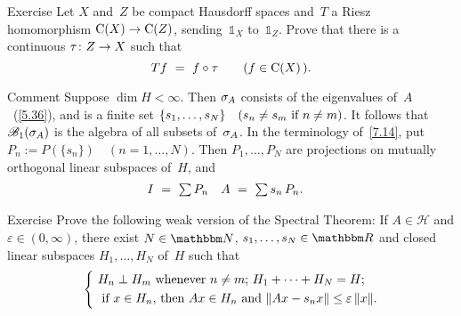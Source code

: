 \documentclass[main.tex]{subfiles}
\begin{document}
%
%
\begin{psec}{7.15}{Exercise}
Let $X$ and~$Z$ be compact Hausdorff spaces
and~$T$ a Riesz homomorphism $\mathrm{C}(X)\rightarrow\mathrm{C}(Z)$,
sending~$\mathbb{1}_X$ to~$\mathbb{1}_Z$.
Prove that there is a continuous $\tau\colon Z\rightarrow X$
such that
\begin{equation*}
Tf\ =\ f\circ\tau\qquad (f\in\Cont{X}\,)\htam{.}
\end{equation*}
\end{psec}
%
%
\begin{psec}{7.16}{Comment}
Suppose $\dim H<\infty$.
Then $\sigma_{A}$ consists of the eigenvalues of~$A$~(\ref{5.36}),
and is a finite set $\{s_1,\dotsc,s_N\}\quad(s_n\neq s_m\text{ if }n\neq m)$.
It follows that~$\mathscr{B}_1(\sigma_{A})$ is
the algebra of all subsets of~$\sigma_{A}$.
In the terminology of~\ref{7.14},
put $P_n:=P(\{s_n\})\quad(n=1,\dotsc,N)$.
Then $P_1,\dotsc,P_N$ are projections
on mutually orthogonal linear subspaces of~$H$, and
\begin{align*}
I\ &=\ {\textstyle\sum}\,P_n &
A\ &=\ {\textstyle\sum}\,s_n\,P_n\text{.}
\end{align*}
\end{psec}
%
%
\begin{psec}{7.17}{Exercise}
Prove the following weak version of the Spectral Theorem:
If $A\in\mathscr H$
and $\varepsilon\in(0,\infty)$,
there exist $N\in\N$,
$s_1,\dotsc,s_N\in\R$
and closed linear subspaces
$H_1,\dotsc,H_N$ of~$H$ such that
\begin{equation*}
\left\{\ 
\begin{aligned}
&H_n\perp H_m \htam{ whenever }n\neq m\htam{; }H_1+\dotsb+H_N=H\htam{;} \\
&\htam{ if }x\in H_n\htam{, then }Ax\in H_n\htam{ and }
\|Ax -s_nx\|\leq\varepsilon\,\|x\|\htam{.}
\end{aligned}
\right.
\end{equation*}
\end{psec}
%
%
%
\clearpage
\end{document}
